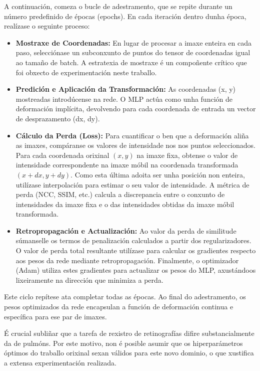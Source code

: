 A continuación, comeza o bucle de adestramento, que se repite durante un número predefinido de épocas (epochs). En cada iteración dentro dunha época, realízase o seguinte proceso:
\begin{itemize}
    \item \textbf{Mostraxe de Coordenadas:} En lugar de procesar a imaxe enteira en cada paso, selecciónase un subconxunto de puntos do tensor de coordenadas igual ao tamaño de batch. A estratexia de mostraxe é un compoñente crítico que foi obxecto de experimentación neste traballo.

    \item \textbf{Predición e Aplicación da Transformación:} As coordenadas (x, y) mostreadas introdúcense na rede. O MLP actúa como unha función de deformación implícita, devolvendo para cada coordenada de entrada un vector de desprazamento (dx, dy). 

    \item \textbf{Cálculo da Perda (Loss):} Para cuantificar o ben que a deformación aliña as imaxes, compáranse os valores de intensidade nos nos puntos seleccionados. Para cada coordenada orixinal $(x,y)$ na imaxe fixa, obtense o valor de intensidade correspondente na imaxe móbil na coordenada transformada $(x + dx, y + dy)$. Como esta última adoita ser unha posición non enteira, utilízase interpolación para estimar o seu valor de intensidade. A métrica de perda (NCC, SSIM, etc.) calcula a discrepancia entre o conxunto de intensidades da imaxe fixa e o das intensidades obtidas da imaxe móbil transformada.

    \item \textbf{Retropropagación e Actualización:} Ao valor da perda de similitude súmanselle os termos de penalización calculados a partir dos regularizadores. O valor de perda total resultante utilízase para calcular os gradientes respecto aos pesos da rede mediante retropropagación. Finalmente, o optimizador (Adam) utiliza estes gradientes para actualizar os pesos do MLP, axustándoos lixeiramente na dirección que minimiza a perda.
\end{itemize}

Este ciclo repítese ata completar todas as épocas. Ao final do adestramento, os pesos optimizados da rede encapsulan a función de deformación continua e específica para ese par de imaxes.

É crucial subliñar que a tarefa de rexistro de retinografías difire substancialmente da de pulmóns. Por este motivo, non é posible asumir que os hiperparámetros óptimos do traballo orixinal sexan válidos para este novo dominio, o que xustifica a extensa experimentación realizada.


